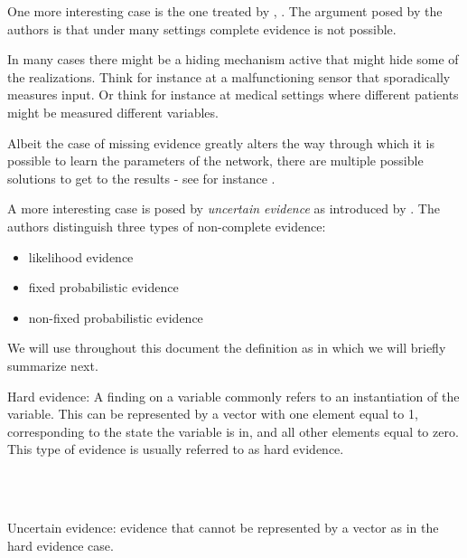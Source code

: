 \documentclass[11pt]{article}
\begin{document}
\begin{article}
One more interesting case is the one treated by \cite{Mrad_2015},
\cite{Wasserkrug_all}. The argument posed by the authors is that under
many settings complete evidence is not possible.

In many cases there might be a hiding mechanism active that might
hide some of the realizations. Think for instance at a
malfunctioning sensor that sporadically measures input. Or think for
instance at medical settings where different patients might be
measured different variables.

Albeit the case of missing evidence greatly alters the way through
which it is possible to learn the parameters of the network, there
are multiple possible solutions to get to the results - see for
instance \cite{koller2009probabilistic}.

A more interesting case is posed by \emph{uncertain evidence} as
introduced by \cite{Mrad_2015}. The authors distinguish three types of
non-complete evidence:

\begin{itemize}
\item likelihood evidence

\item fixed probabilistic evidence

\item non-fixed probabilistic evidence
\end{itemize}

We will use throughout this document the definition as in
\cite{Mrad_2015} which we will briefly summarize next.

\begin{definition}
Hard evidence: A finding on a variable commonly refers to an
instantiation of the variable. This can be represented by a vector
with one element equal to 1, corresponding to the state the variable
is in, and all other elements equal to zero. This type of evidence
is usually referred to as hard evidence.
\end{definition}

\\\\

\begin{definition}
Uncertain evidence: evidence that cannot be represented by a vector
as in the hard evidence case.
\end{definition}

\\\\


\end{article}
\end{document}
